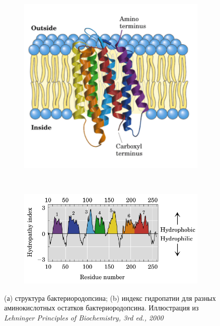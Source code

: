 \documentclass[letterpaper, 11pt]{article}
\begin{document}
\begin{figure}
        \centering
        \begin{subfigure}[b]{0.39\textwidth}
                \includegraphics[width=\textwidth]{images/rhodopsin.png}
                \caption{}
                \label{fig:rhod1}
        \end{subfigure}
        ~ %
        \begin{subfigure}[b]{0.55\textwidth}
                \includegraphics[width=\textwidth]{images/rhodopsin2.png}
                \caption{}
                \label{fig:rhod2}
        \end{subfigure} 
        \caption{(а) структура бактериородопсина; (b) индекс гидропатии для разных аминокислотных остатков бактериородопсина. Иллюстрация из \textit{Lehninger Principles of Biochemistry, 3rd ed., 2000}}\label{fig:rhodopsin}
\end{figure}
\end{document}

